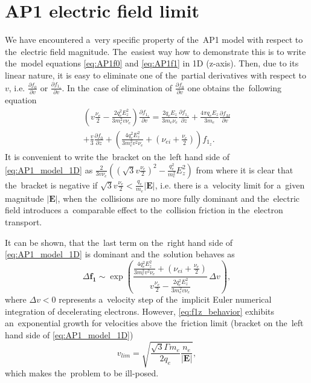 \documentclass[
 aps,
 jmp,
 amsmath,amssymb,
 twocolumn,
]{revtex4-1}
\newcommand{\pdv}[2]{\frac{\partial{#1}}{\partial{#2}}}
\newcommand{\vect}[1]{\boldsymbol{#1}}
\newcommand{\nue}{\nu_{e}}
\newcommand{\nuei}{\nu_{ei}}
\newcommand{\vmag}{v}
\newcommand{\E}{\vect{E}}
\newcommand{\Ez}{E_z}
\newcommand{\qe}{q_e}
\newcommand{\me}{m_e}
\newcommand{\fM}{f_M}
\newcommand{\fzero}{f_0}
\newcommand{\fone}{{\vect{f_1}}}
\newcommand{\fonez}{f_{1_z}}
\begin{document}
\section{AP1 electric field limit}
\label{app:AP1limit}

We have encountered a~very specific property of the~AP1 model
with respect to the~electric field magnitude. The~easiest way how to 
demonstrate this is to write the~model equations \eqref{eq:AP1f0} and 
\eqref{eq:AP1f1} in 1D (z-axis). Then, due to its linear nature, it is easy 
to eliminate one of the~partial derivatives with respect to $\vmag$, i.e. 
$\pdv{\fzero}{\vmag}$ or $\pdv{\fonez}{\vmag}$. 
In the~case of elimination of $\pdv{\fzero}{\vmag}$ 
one obtains the~following equation
\begin{multline}
  \left(\vmag\frac{\nue}{2} - \frac{2\qe^2\Ez^2}{3\me^2\vmag\nue}\right) 
  \pdv{\fonez}{\vmag} 
  =
  \frac{2\qe\Ez}{3\me\nue}\pdv{\fonez}{z}  
  + \frac{4\pi\qe\Ez}{3\me}\pdv{\fM}{\vmag} \\
  + \frac{\vmag}{3}\pdv{\fzero}{z} 
  + \left(\frac{4\qe^2\Ez^2}{3\me^2\vmag^2\nue}
  + \left(\nuei + \frac{\nue}{2}\right) \right)\fonez .
  \label{eq:AP1_model_1D}
\end{multline}
It is convenient to write the~bracket on the~left hand side of 
\eqref{eq:AP1_model_1D} as
$\frac{2}{3\vmag\nue} 
\left(\left(\sqrt{3}\vmag\frac{\nue}{2}\right)^2 
- \frac{\qe^2}{\me^2}\Ez^2\right)$
from where it is clear that the~bracket is negative if 
$\sqrt{3}\vmag\frac{\nue}{2} < \frac{\qe}{\me}|\E|$, 
i.e. there is a~velocity limit for a~given magnitude $|\E|$, 
when the~collisions are no more fully dominant and the~electric field 
introduces a~comparable effect to the~collision friction in 
the~electron transport.

It can be shown, that the~last term on the~right hand side of 
\eqref{eq:AP1_model_1D} is dominant and the~solution behaves as 
\begin{equation}
  \Delta \fone \sim \exp\left(\frac{\frac{4\qe^2\Ez^2}{3\me^2\vmag^2\nue}
  + \left(\nuei + \frac{\nue}{2}\right)}
  {\vmag\frac{\nue}{2} - \frac{2\qe^2\Ez^2}{3\me^2\vmag\nue}}\, 
  \Delta\vmag\right) ,
  \label{eq:f1z_behavior}
\end{equation}
where $\Delta \vmag < 0$ represents a~velocity step of the~implicit Euler
numerical integration of decelerating electrons.
However, \eqref{eq:f1z_behavior} exhibits an~exponential growth 
for velocities above the~friction limit (bracket on the~left hand side of 
\eqref{eq:AP1_model_1D})
\begin{equation}
  \vmag_{lim}  = \sqrt{\frac{\sqrt{3}\Gamma\me}{2\qe}\frac{n_e}{|\E|}} ,
  \label{app_eq:v_limit}
\end{equation}
which makes the~problem to be ill-posed.
\end{document}
